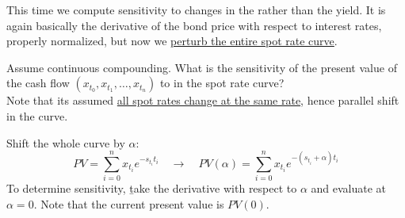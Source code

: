 This time we compute sensitivity to changes in the  rather than the yield. It is again basically the derivative of the bond price with respect to interest rates, properly normalized, but now we \ul{perturb the entire spot rate curve}.

Assume continuous compounding. What is the sensitivity of the present value of the cash flow $(x_{t_0}, x_{t_1}, \dots, x_{t_n})$ to  in the spot rate curve?
\\Note that its assumed \underline{all spot rates change at the same rate}, hence parallel shift in the curve.

\begin{center}
\end{center}

Shift the whole curve by $\alpha$:
\[PV = \sum_{i=0}^{n}x_{t_i}e^{-s_{t_i}t_i} \quad \rightarrow \quad PV(\alpha) = \sum_{i=0}^{n}x_{t_i}e^{-(s_{t_i}+\alpha)t_i}\]
To determine sensitivity, \b{take the derivative with respect to $\alpha$ and evaluate at $\alpha = 0$}. Note that the current present value is $PV(0)$.

